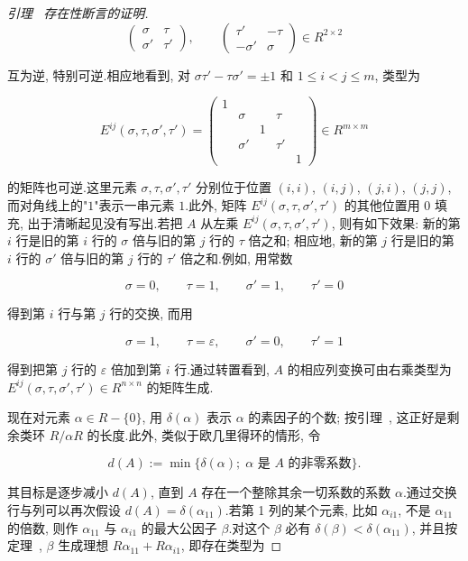 \begin{proof}[引理~ 存在性断言的证明]
\[
\left(\begin{array}{cc} \sigma & \tau \\ \sigma' & \tau' \end{array}\right), \qquad \left(\begin{array}{cc} \tau' & -\tau \\ -\sigma' & \sigma \end{array}\right) \in R^{2 \times 2}\]

互为逆, 特别可逆.相应地看到, 对 $\sigma \tau' - \tau \sigma' = \pm 1$ 和 $1 \leq i < j \leq m$, 类型为

\[
E^{ij}(\sigma, \tau, \sigma', \tau') = \left(\begin{array}{ccccc}
1 & & & & \\
 & \sigma & & \tau & \\
 & & 1 & & \\
 & \sigma' & & \tau' & \\
 & & & & 1
\end{array}\right) \in R^{m \times m}\]

的矩阵也可逆.这里元素 $\sigma, \tau, \sigma', \tau'$ 分别位于位置 $(i, i)$, $(i, j)$, $(j, i)$, $(j, j)$, 而对角线上的"$1$"表示一串元素 $1$.此外, 矩阵 $E^{ij}(\sigma, \tau, \sigma', \tau')$ 的其他位置用 $0$ 填充, 出于清晰起见没有写出.若把 $A$ 从左乘 $E^{ij}(\sigma, \tau, \sigma', \tau')$, 则有如下效果: 新的第 $i$ 行是旧的第 $i$ 行的 $\sigma$ 倍与旧的第 $j$ 行的 $\tau$ 倍之和; 相应地, 新的第 $j$ 行是旧的第 $i$ 行的 $\sigma'$ 倍与旧的第 $j$ 行的 $\tau'$ 倍之和.例如, 用常数

\[
\sigma = 0, \qquad \tau = 1, \qquad \sigma' = 1, \qquad \tau' = 0\]

得到第 $i$ 行与第 $j$ 行的交换, 而用

\[
\sigma = 1, \qquad \tau = \varepsilon, \qquad \sigma' = 0, \qquad \tau' = 1\]

得到把第 $j$ 行的 $\varepsilon$ 倍加到第 $i$ 行.通过转置看到, $A$ 的相应列变换可由右乘类型为 $E^{ij}(\sigma, \tau, \sigma', \tau') \in R^{n \times n}$ 的矩阵生成.

现在对元素 $\alpha \in R - \{0\}$, 用 $\delta(\alpha)$ 表示 $\alpha$ 的素因子的个数; 按引理~, 这正好是剩余类环 $R/\alpha R$ 的长度.此外, 类似于欧几里得环的情形, 令

\[
d(A) := \min\{\delta(\alpha);\; \alpha \text{ 是 } A \text{ 的非零系数}\}\text{.}\]

其目标是逐步减小 $d(A)$, 直到 $A$ 存在一个整除其余一切系数的系数 $\alpha$.通过交换行与列可以再次假设 $d(A) = \delta(\alpha_{11})$.若第 1 列的某个元素, 比如 $\alpha_{i1}$, 不是 $\alpha_{11}$ 的倍数, 则作 $\alpha_{11}$ 与 $\alpha_{i1}$ 的最大公因子 $\beta$.对这个 $\beta$ 必有 $\delta(\beta) < \delta(\alpha_{11})$, 并且按定理~, $\beta$ 生成理想 $R\alpha_{11} + R\alpha_{i1}$, 即存在类型为


\end{proof}

